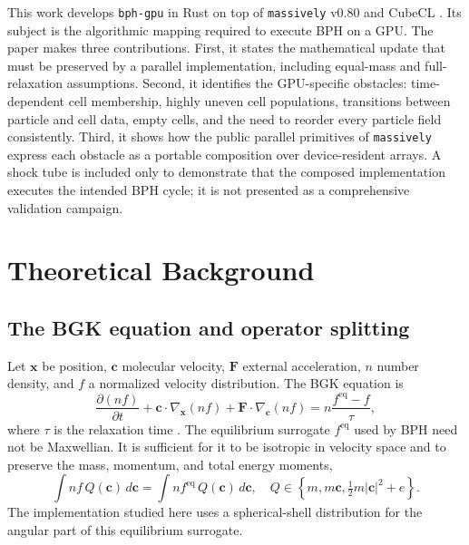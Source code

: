 \documentclass[a4paper,11pt]{article}
\newcommand{\bphgpu}{\texttt{bph-gpu}\xspace}
\newcommand{\massively}{\texttt{massively}\xspace}
\newcommand{\cubecl}{CubeCL\xspace}
\newcommand{\vect}[1]{\bm{#1}}
\begin{document}
This work develops \bphgpu in Rust on top of \massively v0.80 and \cubecl
\cite{massively,cubecl}.  Its subject is the algorithmic mapping required to
execute BPH on a GPU.  The paper makes three contributions.  First, it states
the mathematical update that must be preserved by a parallel implementation,
including equal-mass and full-relaxation assumptions.  Second, it identifies
the GPU-specific obstacles: time-dependent cell membership, highly uneven cell
populations, transitions between particle and cell data, empty cells, and the
need to reorder every particle field consistently.  Third, it shows how the
public parallel primitives of \massively express each obstacle as a portable
composition over device-resident arrays.  A shock tube is included only to
demonstrate that the composed implementation executes the intended BPH cycle;
it is not presented as a comprehensive validation campaign.

\section{Theoretical Background}

\subsection{The BGK equation and operator splitting}

Let $\vect{x}$ be position, $\vect{c}$ molecular velocity, $\vect{F}$ external
acceleration, $n$ number density, and $f$ a normalized velocity distribution.
The BGK equation is
\begin{equation}
 \frac{\partial(nf)}{\partial t}
 + \vect{c}\cdot\nabla_{\vect{x}}(nf)
 + \vect{F}\cdot\nabla_{\vect{c}}(nf)
 = n\frac{f^{\mathrm{eq}}-f}{\tau},
 \label{eq:bgk}
\end{equation}
where $\tau$ is the relaxation time \cite{bgk}.  The equilibrium surrogate
$f^{\mathrm{eq}}$ used by BPH need not be Maxwellian.  It is sufficient for it
to be isotropic in velocity space and to preserve the mass, momentum, and total
energy moments,
\begin{equation}
 \int nf\,Q(\vect{c})\,d\vect{c}
 =\int nf^{\mathrm{eq}}\,Q(\vect{c})\,d\vect{c},
 \quad
 Q\in\left\{m,m\vect{c},\tfrac12m|\vect{c}|^2+e\right\}.
 \label{eq:moments}
\end{equation}
The implementation studied here uses a spherical-shell distribution for the
angular part of this equilibrium surrogate.
\end{document}
